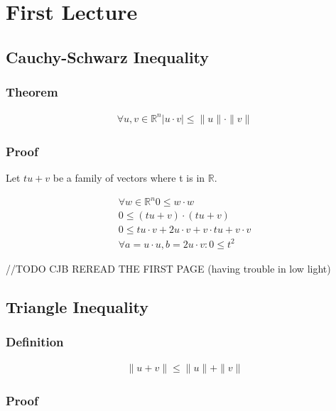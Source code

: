 \chapter{First Lecture}

\section{Cauchy-Schwarz Inequality}

	\subsection{Theorem}
		\begin{align}
			\forall u, v \in \mathbb{R}^n |u \cdot v| \leq \|u\| \cdot \|v\|
		\end{align}
  
	\subsection{Proof}
	
		Let $tu + v$ be a family of vectors where t is in $\mathbb{R}$.
	
		\begin{align}
			\forall w \in \mathbb{R}^n 0 \leq w \cdot w \\
			0 \leq (tu + v) \cdot (tu + v) \\
			0 \leq tu \cdot v  + 2u \cdot v + v \cdot tu + v \cdot v \\
			\forall a = u \cdot u, b = 2u \cdot v: 0 \leq t^2
		\end{align}
		
	//TODO CJB REREAD THE FIRST PAGE (having trouble in low light)
		
\section{Triangle Inequality}

	\subsection{Definition}
	
		\begin{align}
			\|u+v\| \leq \|u\| + \|v\|
		\end{align}
		
	\subsection{Proof}
	
